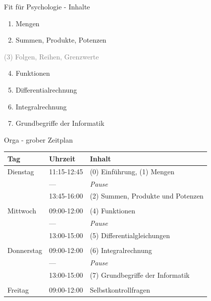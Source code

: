\documentclass[
  8pt,
  ignorenonframetext,
  t]{beamer}
\begin{document}
\begin{frame}{Fit für Psychologie - Inhalte}
\protect\hypertarget{fit-fuxfcr-psychologie---inhalte}{}
\large
\vfill

\begin{enumerate}
[(1)]
\item
  Mengen
\item
  Summen, Produkte, Potenzen
\end{enumerate}

\textcolor{gray}{(3) Folgen, Reihen, Grenzwerte}

\begin{enumerate}
[(1)]
\setcounter{enumi}{3}
\item
  Funktionen
\item
  Differentialrechnung
\item
  Integralrechnung
\item
  Grundbegriffe der Informatik \vfill
\end{enumerate}
\end{frame}

\begin{frame}{Orga - grober Zeitplan}
\protect\hypertarget{orga---grober-zeitplan}{}
\vspace{12mm}

\small

\begin{longtable}[]{@{}lll@{}}
\toprule()
Tag & Uhrzeit & Inhalt \\
\midrule()
\endhead
Dienstag & 11:15-12:45 & (0) Einführung, (1) Mengen \\
& --- & \emph{Pause} \\
& 13:45-16:00 & (2) Summen, Produkte und Potenzen \\
& & \\
Mittwoch & 09:00-12:00 & (4) Funktionen \\
& --- & \emph{Pause} \\
& 13:00-15:00 & (5) Differentialgleichungen \\
& & \\
Donnerstag & 09:00-12:00 & (6) Integralrechnung \\
& --- & \emph{Pause} \\
& 13:00-15:00 & (7) Grundbegriffe der Informatik \\
& & \\
Freitag & 09:00-12:00 & Selbstkontrollfragen \\
\bottomrule()
\end{longtable}
\end{frame}
\end{document}
